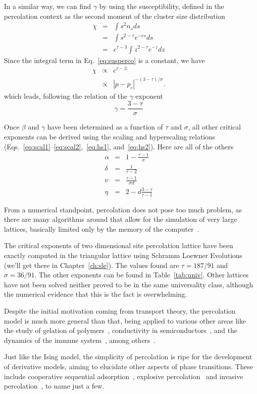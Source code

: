 In a similar way, we can find $\gamma$ by using the susceptibility, defined in
the percolation context as the second moment of the cluster size distribution
\begin{eqnarray}
    \chi & = & \int s^{2}n_{s}ds\\
      & = & \int s^{2-\tau}e^{-cs}ds\\
      & = & c^{\tau-3}\int z^{2-\tau}e^{-z}dz
    \label{eq:susperco}
\end{eqnarray}
Since the integral term in Eq.~\ref{eq:susperco} is a constant, we have
\begin{eqnarray}
    \chi & \propto & c^{\tau-3}\\
 & \propto & \left|p-p_{c}\right|^{-\left(3-\tau\right)/\sigma}.
\end{eqnarray}
which leads, following the relation of the $\gamma$ exponent
\begin{equation}
    \gamma=\frac{3-\tau}{\sigma}
\end{equation}


Once $\beta$ and $\gamma$ have been determined as a function of $\tau$ and
$\sigma$, all other critical exponents can be derived using the scaling
and hyperscaling relations (Eqs.~\ref{eq:scal1}--\ref{eq:scal2},~\ref{eq:hs1},
and~\ref{eq:hs2}). Here
are all of the others
\begin{eqnarray}
    \alpha & = & 1-\frac{\tau-1}{\sigma}\\
    \delta & = & \frac{1}{\tau-2}\\
    \nu    & = & \frac{\tau-1}{\sigma d}\\
    \eta   & = & 2-d\frac{3-\tau}{\tau-1}
\end{eqnarray}

From a numerical standpoint, percolation does not pose too much problem, as
there are many algorithms around that allow for the simulation of very large
lattices, basically limited only by the memory of the
computer~\cite{Newman2000}.

The critical exponents of two dimensional site percolation lattice have been
exactly computed in the triangular lattice using Schramm Loewner
Evolutions~\cite{Smirnov2001} (we'll get there in Chapter~\ref{ch:sle}). The
values found are $\tau=187/91$ and $\sigma=36/91$. The other exponents can be
found in Table~\ref{tab:univ}. Other lattices have not been solved neither
proved to be in the same universality class, although the numerical evidence
that this is the fact is overwhelming.

Despite the initial motivation coming from transport theory, the percolation
model is much more general than that, being applied to various other areas like
the study of gelation of polymers~\cite{DeCandia2005}, conductivity in
semiconductors~\cite{Ambegaokar1971}, and the dynamics of the immune
system~\cite{Stewart1991}, among others~\cite{Sahimi1994}.

Just like the Ising model, the simplicity of percolation is ripe for the
development of derivative models, aiming to elucidate other aspects of phase
transitions. These include cooperative sequential adsorption~\cite{Araujo2013},
explosive percolation~\cite{Achlioptas2009} and invasive
percolation~\cite{Wilkinson1983}, to name just a few.


